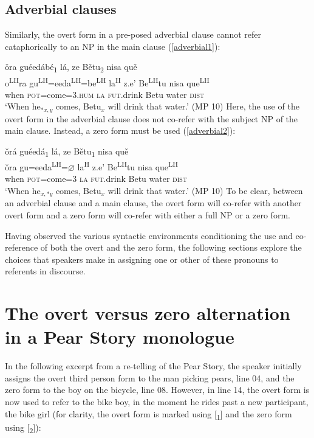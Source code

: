 \subsection{Adverbial clauses}

Similarly, the overt form in a pre-posed adverbial clause cannot refer cataphorically to an NP in the main clause (\ref{adverbial1}):

\ea\label{adverbial1}
\glll \v{o}ra gu\'{e}ed\'{a}b\'{e}\textsubscript{1} l\'{a}, ze B\v{e}tu\textsubscript{2} nisa qu\v{e} \\
o\textsuperscript{LH}ra gu\textsuperscript{LH}=eeda\textsuperscript{LH}=be\textsuperscript{LH}  la\textsuperscript{H} z.e' Be\textsuperscript{LH}tu nisa que\textsuperscript{LH} \\
when \textsc{pot}=come=\textsc{3.hum} \textsc{la} \textsc{fut}.drink Betu water  \textsc{dist} \\
\glt `When he$_{*x, y}$ comes, Betu$_{x}$ will drink that water.'  \hfill{(MP 10)}
\z
Here, the use of the overt form in the adverbial clause does not co-refer with the subject NP of the main clause. Instead, a zero form must be used (\ref{adverbial2}):

\ea\label{adverbial2}
\glll \v{o}r\'{a} gu\'{e}ed\'{a}\textsubscript{1} l\'{a}, ze B\v{e}tu\textsubscript{1} nisa qu\v{e} \\
\v{o}ra gu=eeda\textsuperscript{LH}={$\varnothing$} la\textsuperscript{H} z.e' Be\textsuperscript{LH}tu nisa que\textsuperscript{LH} \\
when \textsc{pot}=come=\textsc{3} \textsc{la} \textsc{fut}.drink Betu water  \textsc{dist} \\
\glt `When he$_{x, *y}$ comes, Betu$_{x}$ will drink that water.' \hfill{(MP 10)}
\z
To be clear, between an adverbial clause and a main clause, the overt form will co-refer with another overt form and a zero form will co-refer with either a full NP or a zero form. 

Having observed the various syntactic environments conditioning the use and co-reference of both the overt and the zero form, the following sections explore the choices that speakers make in assigning one or other of these pronouns to referents in discourse.


\section{The overt versus zero alternation in a Pear Story monologue}

In the following excerpt from a re-telling of the Pear Story, the speaker initially assigns the overt third person form to the man picking pears, line 04, and the zero form to the boy on the bicycle, line 08. However, in line 14, the overt form is now used to refer to the bike boy, in the moment he rides past a new participant, the bike girl (for clarity, the overt form is marked using [\textsubscript{1}] and the zero form using [\textsubscript{2}]):

